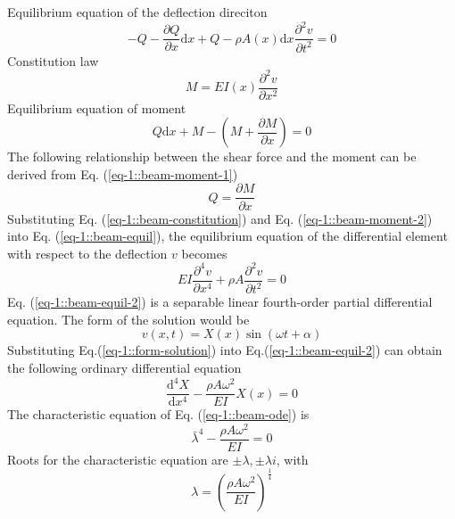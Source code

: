 Equilibrium equation of the deflection direciton
\begin{equation}\label{eq-1::beam-equil}
    -Q - \frac{\partial Q}{\partial x}\mathrm{d}x + Q - \rho A(x)\mathrm{d}x\frac{\partial^{2}v}{\partial t^{2}} = 0
\end{equation}
Constitution law
\begin{equation}\label{eq-1::beam-constitution}
    M = EI(x)\frac{\partial^{2}v}{\partial x^{2}}
\end{equation}
Equilibrium equation of moment
\begin{equation}\label{eq-1::beam-moment-1}
    Q\mathrm{d}x + M - \left(M + \frac{\partial M}{\partial x}\right) = 0
\end{equation}
The following relationship between the shear force and the moment can be derived from Eq. (\ref{eq-1::beam-moment-1}) 
\begin{equation}\label{eq-1::beam-moment-2}
    Q = \frac{\partial M}{\partial x}
\end{equation}
Substituting Eq. (\ref{eq-1::beam-constitution}) and Eq. (\ref{eq-1::beam-moment-2}) into Eq. (\ref{eq-1::beam-equil}), 
the equilibrium equation of the differential element with respect to the deflection $v$ becomes
\begin{equation}\label{eq-1::beam-equil-2}
    EI\frac{\partial ^{4} v}{\partial x^{4}} + \rho A\frac{\partial^{2}v}{\partial t^{2}} = 0
\end{equation}
Eq. (\ref{eq-1::beam-equil-2}) is a separable linear fourth-order partial differential equation. 
The form of the solution would be 
\begin{equation}\label{eq-1::form-solution}
    v(x,t)=X(x)\sin\left(\omega t + \alpha\right)
\end{equation}
Substituting Eq.(\ref{eq-1::form-solution}) into Eq.(\ref{eq-1::beam-equil-2}) 
can obtain the following ordinary differential equation 
\begin{equation}\label{eq-1::beam-ode}
    \frac{\mathrm{d}^{4} X}{\mathrm{d}x^{4}} - \frac{\rho A\omega^{2}}{EI}X(x) = 0
\end{equation}
The characteristic equation of Eq. (\ref{eq-1::beam-ode}) is 
\begin{equation}\label{eq-1::beam-character}
    \bar{\lambda}^{4} - \frac{\rho A\omega^{2}}{EI} = 0
\end{equation}
Roots for the characteristic equation are $\pm\lambda, \pm\lambda i$, with 
\begin{equation}\label{eq-1::beam-eigen}
    \lambda = \left(\frac{\rho A\omega^{2}}{EI}\right)^{\frac{1}{4}}
\end{equation}
